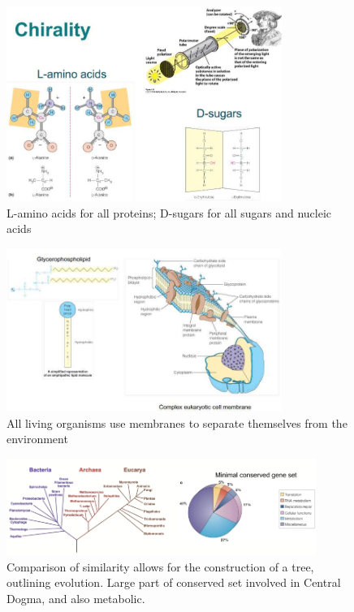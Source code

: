 \documentclass[]{article}
\begin{document}
\begin{figure}[H]
	\caption[L-amino acids and D-sugars]{L-amino acids for all proteins; D-sugars for all sugars and nucleic acids}\label{fig:Chirality}
	\includegraphics[width=0.8\textwidth]{Chirality}
\end{figure}

\begin{figure}[H]
	\caption[All living organisms use membranes]{All living organisms use membranes to separate themselves from the environment}\label{fig:Membranes}
	\includegraphics[width=0.8\textwidth]{Membranes}
\end{figure}
\begin{figure}[H]
	\caption[Comparison of similarity allows for the
		construction of a tree]{Comparison of similarity allows for the
		construction of a tree, outlining evolution. Large part of conserved set involved in Central Dogma, and also metabolic.}\label{fig:Phylogeny} 
	\includegraphics[width=0.9\textwidth]{Phylogeny}
\end{figure}
\end{document}
